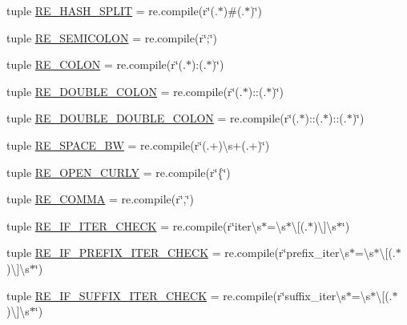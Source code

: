 \begin{DoxyCompactItemize}
tuple \hyperlink{namespacesrc_1_1regex_ae7a763293a55cb767e2fd3abd69247a1}{R\-E\-\_\-\-H\-A\-S\-H\-\_\-\-S\-P\-L\-I\-T} = re.\-compile(r\char`\"{}(.$\ast$)\#(.$\ast$)\char`\"{})
\item 
tuple \hyperlink{namespacesrc_1_1regex_af7aee76f666fcda81f9cf0f1fa12641a}{R\-E\-\_\-\-S\-E\-M\-I\-C\-O\-L\-O\-N} = re.\-compile(r\char`\"{};\char`\"{})
\item 
tuple \hyperlink{namespacesrc_1_1regex_a79ecaa21eb028d541077e037c02ca6e8}{R\-E\-\_\-\-C\-O\-L\-O\-N} = re.\-compile(r\char`\"{}(.$\ast$)\-:(.$\ast$)\char`\"{})
\item 
tuple \hyperlink{namespacesrc_1_1regex_a5f007b56ca09ea55d7c68559c16b21dc}{R\-E\-\_\-\-D\-O\-U\-B\-L\-E\-\_\-\-C\-O\-L\-O\-N} = re.\-compile(r\char`\"{}(.$\ast$)\-::(.$\ast$)\char`\"{})
\item 
tuple \hyperlink{namespacesrc_1_1regex_aedd842d031aea4fe0739ceaccc4d38bd}{R\-E\-\_\-\-D\-O\-U\-B\-L\-E\-\_\-\-D\-O\-U\-B\-L\-E\-\_\-\-C\-O\-L\-O\-N} = re.\-compile(r\char`\"{}(.$\ast$)\-::(.$\ast$)\-::(.$\ast$)\char`\"{})
\item 
tuple \hyperlink{namespacesrc_1_1regex_a8cb9e83aa28c0fcc989e80187ee4033c}{R\-E\-\_\-\-S\-P\-A\-C\-E\-\_\-\-B\-W} = re.\-compile(r\char`\"{}(.+)\textbackslash{}s+(.+)\char`\"{})
\item 
tuple \hyperlink{namespacesrc_1_1regex_a59dc81bc857406078f80dc26d12510e7}{R\-E\-\_\-\-O\-P\-E\-N\-\_\-\-C\-U\-R\-L\-Y} = re.\-compile(r\char`\"{}\{\char`\"{})
\item 
tuple \hyperlink{namespacesrc_1_1regex_ad704afcaad5c594908d369d49901768b}{R\-E\-\_\-\-C\-O\-M\-M\-A} = re.\-compile(r\char`\"{},\char`\"{})
\item 
tuple \hyperlink{namespacesrc_1_1regex_aca165a42adddc0acfc303d8bdf468920}{R\-E\-\_\-\-I\-F\-\_\-\-I\-T\-E\-R\-\_\-\-C\-H\-E\-C\-K} = re.\-compile(r\char`\"{}iter\textbackslash{}s$\ast$=\textbackslash{}s$\ast$\textbackslash{}\mbox{[}(.$\ast$)\textbackslash{}\mbox{]}\textbackslash{}s$\ast$\char`\"{})
\item 
tuple \hyperlink{namespacesrc_1_1regex_a84d5f9faa03d1345f485f7ca55a2e06c}{R\-E\-\_\-\-I\-F\-\_\-\-P\-R\-E\-F\-I\-X\-\_\-\-I\-T\-E\-R\-\_\-\-C\-H\-E\-C\-K} = re.\-compile(r\char`\"{}prefix\-\_\-iter\textbackslash{}s$\ast$=\textbackslash{}s$\ast$\textbackslash{}\mbox{[}(.$\ast$)\textbackslash{}\mbox{]}\textbackslash{}s$\ast$\char`\"{})
\item 
tuple \hyperlink{namespacesrc_1_1regex_a0733ed201d567931f64d73e2ccefc437}{R\-E\-\_\-\-I\-F\-\_\-\-S\-U\-F\-F\-I\-X\-\_\-\-I\-T\-E\-R\-\_\-\-C\-H\-E\-C\-K} = re.\-compile(r\char`\"{}suffix\-\_\-iter\textbackslash{}s$\ast$=\textbackslash{}s$\ast$\textbackslash{}\mbox{[}(.$\ast$)\textbackslash{}\mbox{]}\textbackslash{}s$\ast$\char`\"{})

\end{DoxyCompactItemize}
